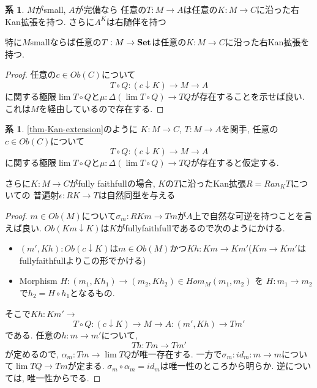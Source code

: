 \documentclass[dvipdfmx,a4paper,11pt]{article}
\theoremstyle{definition}
\newtheorem{cor}[thm]{系}
\begin{document}
 \begin{tcolorbox}
 [colback = white, colframe = green!35!black, fonttitle = \bfseries,breakable = true]
\begin{cor}
$M$がsmall, $A$が完備なら
任意の$T : M \to A$は任意の$K : M \to C$に沿った右Kan拡張を持つ. 
さらに$A^K$は右随伴を持つ

特に$M$smallならば任意の$T : M \to {\bf Set}$は任意の$K : M \to C$に沿った右Kan拡張を持つ. 
\end{cor}
\end{tcolorbox}

\begin{proof}
任意の$c \in Ob(C)$について
$$
T \circ Q : (c \downarrow K) \to M \to A
$$
に関する極限$\lim T\circ Q$と$\mu: \Delta (\lim T\circ Q) \to TQ$が存在することを示せば良い.
これは$M$を経由しているので存在する.

\end{proof}

 \begin{tcolorbox}
 [colback = white, colframe = green!35!black, fonttitle = \bfseries,breakable = true]
\begin{cor}
\ref{thm-Kan-extension}のように
$K : M \to C$, $T : M \to A$を関手, 
任意の$c \in Ob(C)$について
$$
T \circ Q : (c \downarrow K) \to M \to A
$$
に関する極限$\lim T\circ Q$と$\mu: \Delta (\lim T\circ Q) \to TQ$が存在すると仮定する.

さらに$K : M \to C$がfully faithfullの場合, 
$K$の$T$に沿ったKan拡張$R = Ran_{K}T$についての
普遍射$\epsilon : RK \to T$は自然同型を与える
\end{cor}
\end{tcolorbox}

\begin{proof}
$m \in Ob(M)$について$\sigma_m : RKm \to Tm$が$A$上で自然な可逆を持つことを言えば良い. 
$Ob(Km \downarrow K)$は$K$がfullyfaithfullであるので次のようにかける.
\begin{itemize}
\item $(m', Kh) : Ob(c \downarrow K)$は$m \in Ob(M)$かつ$Kh : Km \to Km'$($Km \to Km'$はfullyfaithfullよりこの形でかける) %
\item Morphism $H : (m_1, Kh_1)  \to (m_2,Kh_2) \in Hom_{M}(m_1,m_2) $ を 
$H: m_1 \to m_2$で$ h_2 = H \circ h_1 $となるもの.
\end{itemize}
そこで$Kh : Km' \to $
$$
T \circ Q : (c \downarrow K) \to M \to A : (m' , Kh) \to Tm'
$$
である. 任意の$h : m \to m'$について, 
$$
Th : Tm \to Tm' 
$$
が定めるので, $\alpha_m :  Tm \to \lim TQ$が唯一存在する. 
一方で$\sigma_m : id_{m} : m \to m$について$\lim TQ \to Tm$が定まる.
$\sigma_m \circ \alpha_m = id_m$は唯一性のところから明らか. 
逆については, 唯一性からでる. 
\end{proof}
\end{document}

